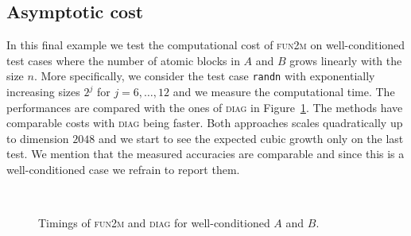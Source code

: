 \documentclass{siamart1116}
\begin{document}
 
 
 
 \subsection{Asymptotic cost}
 In this final example we test the computational cost of \textsc{fun2m} on well-conditioned test cases where the number of atomic blocks in $A$ and $B$ grows linearly with the size $n$. More specifically, we consider the test case \texttt{randn} with exponentially increasing sizes $2^j$ for $j=6,\dots, 12$ and we measure the computational time. The performances are compared with the ones of \textsc{diag} in Figure~\ref{fig:exp3}. The methods have comparable costs with \textsc{diag} being faster. Both approaches scales quadratically up to dimension $2048$ and we start to see the expected cubic growth only on the last test. We mention that the measured accuracies are comparable and since this is a well-conditioned case we refrain to report them.
 
 \begin{figure}
 \centering
 \begin{minipage}{.4\textwidth}
 	\rule{0pt}{1.2cm}
\end{minipage}~\begin{minipage}{.5\textwidth}
 \end{minipage}
 \caption{Timings of \textsc{fun2m} and \textsc{diag} for well-conditioned $A$ and $B$.}\label{fig:exp3}
 \end{figure}
\end{document}
